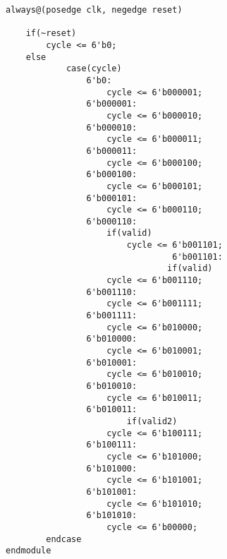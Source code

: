 \begin{lstlisting}[style={verilog-style}]
always@(posedge clk, negedge reset)

	if(~reset)
		cycle <= 6'b0; 
	else   
			case(cycle)
				6'b0:
					cycle <= 6'b000001;
				6'b000001:
					cycle <= 6'b000010;
				6'b000010:
					cycle <= 6'b000011;
				6'b000011:   
					cycle <= 6'b000100;
				6'b000100:
					cycle <= 6'b000101;
				6'b000101:
					cycle <= 6'b000110;
				6'b000110:
					if(valid)
						cycle <= 6'b001101;
								 6'b001101:
								if(valid)
					cycle <= 6'b001110;
				6'b001110:
					cycle <= 6'b001111;
				6'b001111:
					cycle <= 6'b010000;
				6'b010000: 
					cycle <= 6'b010001;
				6'b010001:
					cycle <= 6'b010010;
				6'b010010:
					cycle <= 6'b010011;
				6'b010011:
						if(valid2)
					cycle <= 6'b100111;
				6'b100111:    
					cycle <= 6'b101000;
				6'b101000:            
					cycle <= 6'b101001;
				6'b101001:
					cycle <= 6'b101010;
				6'b101010:
					cycle <= 6'b00000; 
		endcase
endmodule
\end{lstlisting}


